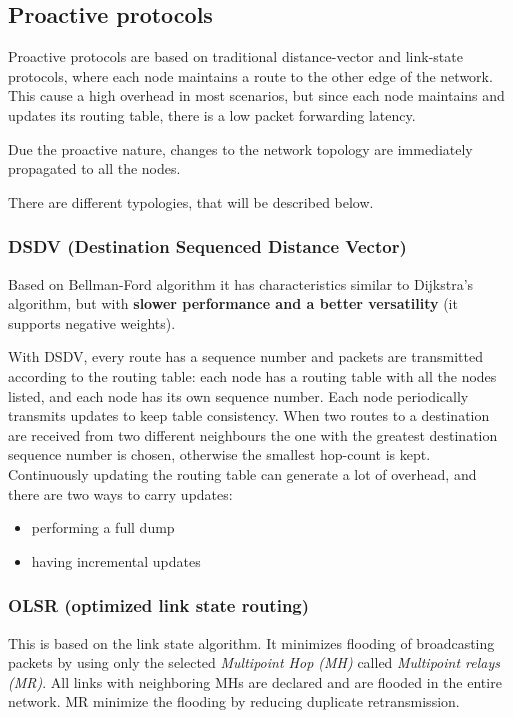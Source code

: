 \subsection{Proactive protocols}

Proactive protocols are based on traditional distance-vector and link-state
protocols, where each node maintains a route to the other edge of the network.
This cause a high overhead in most scenarios, but since each node maintains and
updates its routing table, there is a low packet forwarding latency.

Due the proactive nature, changes to the network topology are immediately
propagated to all the nodes.

There are different typologies, that will be described below.

\subsubsection{DSDV (Destination Sequenced Distance Vector)}

Based on Bellman-Ford algorithm it has characteristics similar to Dijkstra's
algorithm, but with \textbf{slower performance and a better versatility}
(it supports negative weights).

With DSDV, every route has a sequence number and packets are transmitted
according to the routing table: each node has a routing table with
all the nodes listed, and each node has its own sequence number.
Each node periodically transmits updates to keep table consistency.
When two routes to a destination are received from two different neighbours
the one with the greatest destination sequence number is chosen, otherwise the
smallest hop-count is kept.
Continuously updating the routing table can generate a lot of overhead, and
there are two ways to carry updates:
\begin{itemize}
\item performing a full dump
\item having incremental updates
\end{itemize}

\subsubsection{OLSR (optimized link state routing)}

This is based on the link state algorithm. It minimizes flooding of broadcasting
packets by using only the selected \textit{Multipoint Hop (MH)} called
\textit{Multipoint relays (MR)}. All links with neighboring MHs are declared and
are flooded in the entire network. MR minimize the flooding by reducing
duplicate retransmission.

